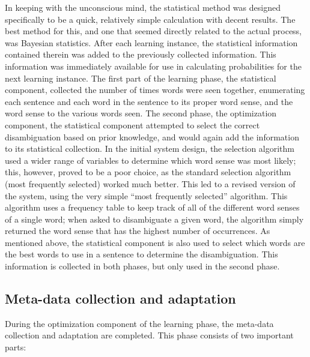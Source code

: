 In keeping with the unconscious mind, the statistical method was designed
specifically to be a quick, relatively simple calculation with decent results.
The best method for this, and one that seemed directly related to the actual
process, was Bayesian statistics.  After each learning instance, the statistical
information contained therein was added to the previously collected
information.  This information was immediately available for use in calculating
probabilities for the next learning instance.  The first part of the learning
phase, the statistical component, collected the number of times words were seen
together, enumerating each sentence and each word in the sentence to its proper
word sense, and the word sense to the various words seen.  The second
phase, the optimization component, the statistical component attempted to select
the correct disambiguation based on prior knowledge, and would again add the
information to its statistical collection.  In the initial system design, the selection algorithm 
used a wider range of variables to determine which word sense was most likely;
this, however, proved to be a poor choice, as the standard selection algorithm
(most frequently selected) worked much better.  This led to a revised version of the system, using the very simple
``most frequently selected'' algorithm.  This algorithm
uses a frequency table to keep track of all of the different word senses of a
single word; when asked to disambiguate a given word, the algorithm simply returned the
word sense that has the highest number of occurrences.  As mentioned above, the
statistical component is also used to select which words are the best words to
use in a sentence to determine the disambiguation. This information is collected
in both phases, but only used in the second phase.

\subsection{Meta-data collection and adaptation}

During the optimization component of the learning phase, the meta-data
collection and adaptation are completed.  This phase consists of two important
parts: 

